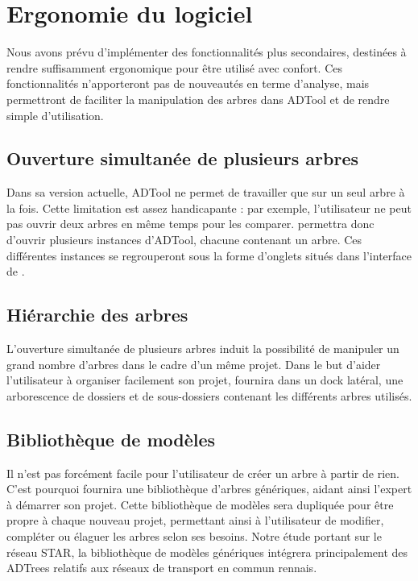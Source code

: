 \section{Ergonomie du logiciel}
	Nous avons prévu d'implémenter des fonctionnalités plus secondaires, destinées à rendre \glasir{} suffisamment ergonomique pour être utilisé avec confort. Ces fonctionnalités n'apporteront pas de nouveautés en terme d'analyse, mais permettront de faciliter la manipulation des arbres dans ADTool et de rendre \glasir{} simple d'utilisation.	

	\subsection{Ouverture simultanée de plusieurs arbres}
		Dans sa version actuelle, ADTool ne permet de travailler que sur un seul arbre à la fois. Cette limitation est assez handicapante : par exemple, l'utilisateur ne peut pas ouvrir deux arbres en même temps pour les comparer. \glasir{} permettra donc d'ouvrir plusieurs instances d'ADTool, chacune contenant un arbre. Ces différentes instances se regrouperont sous la forme d'onglets situés dans l'interface de \glasir{}.
	
	\subsection{Hiérarchie des arbres}
		L'ouverture simultanée de plusieurs arbres induit la possibilité de manipuler un grand nombre d'arbres dans le cadre d'un même projet. Dans le but d'aider l'utilisateur à organiser facilement son projet, \glasir{} fournira dans un dock latéral, une arborescence de dossiers et de sous-dossiers contenant les différents arbres utilisés.

	\subsection{Bibliothèque de modèles}
		Il n'est pas forcément facile pour l'utilisateur de créer un arbre à partir de rien. C'est pourquoi \glasir{} fournira une bibliothèque d'arbres génériques, aidant ainsi l'expert à démarrer son projet. Cette bibliothèque de modèles sera dupliquée pour être propre à chaque nouveau projet, permettant ainsi à l'utilisateur de modifier, compléter ou élaguer les arbres selon ses besoins. Notre étude portant sur le réseau STAR, la bibliothèque de modèles génériques intégrera principalement des ADTrees relatifs aux réseaux de transport en commun rennais. 

